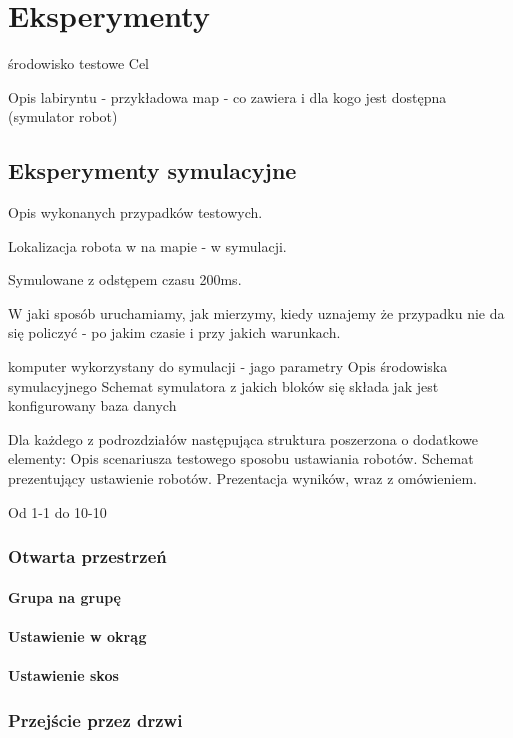 \chapter{Eksperymenty}

środowisko testowe 
Cel

Opis labiryntu - przykładowa map - co zawiera i dla kogo jest dostępna (symulator robot)

\section{Eksperymenty symulacyjne}

Opis wykonanych przypadków testowych.

Lokalizacja robota w na mapie - w symulacji.

Symulowane z odstępem czasu 200ms.

W jaki sposób uruchamiamy, jak mierzymy, kiedy uznajemy że przypadku nie da się policzyć - po jakim czasie i przy jakich warunkach.

komputer wykorzystany do symulacji - jago parametry
Opis środowiska symulacyjnego
Schemat symulatora z jakich bloków się składa
jak jest konfigurowany 
baza danych 


Dla każdego z podrozdziałów następująca struktura poszerzona o dodatkowe elementy:
Opis scenariusza testowego sposobu ustawiania robotów.
Schemat prezentujący ustawienie robotów.
Prezentacja wyników, wraz z omówieniem.

Od 1-1 do 10-10

\subsection{Otwarta przestrzeń}

\subsubsection{Grupa na grupę}

\subsubsection{Ustawienie w okrąg}

\subsubsection{Ustawienie skos}

\subsection{Przejście przez drzwi}


